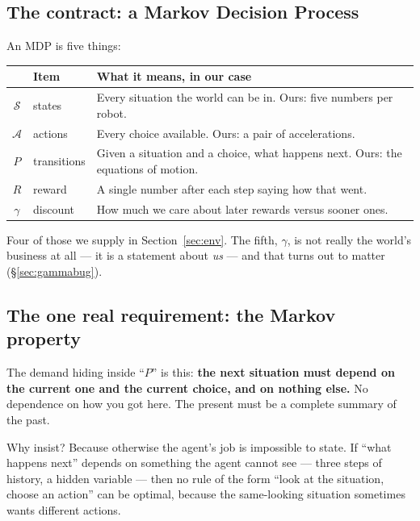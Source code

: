 \documentclass[11pt,a4paper]{article}
\begin{document}
\subsection{The contract: a Markov Decision Process}

An MDP is five things:

\begin{center}
\small
\begin{tabular}{clp{9.4cm}}
\toprule
& \textbf{Item} & \textbf{What it means, in our case} \\
\midrule
$\mathcal S$ & states     & Every situation the world can be in. Ours: five numbers per robot. \\
$\mathcal A$ & actions    & Every choice available. Ours: a pair of accelerations. \\
$P$          & transitions& Given a situation and a choice, what happens next. Ours: the equations of motion. \\
$R$          & reward     & A single number after each step saying how that went. \\
$\gamma$     & discount   & How much we care about later rewards versus sooner ones. \\
\bottomrule
\end{tabular}
\end{center}

Four of those we supply in Section~\ref{sec:env}. The fifth, $\gamma$, is not really the
world's business at all --- it is a statement about \emph{us} --- and that turns out to
matter (\S\ref{sec:gammabug}).

\subsection{The one real requirement: the Markov property}

The demand hiding inside ``$P$'' is this: \textbf{the next situation must depend on the
current one and the current choice, and on nothing else.} No dependence on how you got here.
The present must be a complete summary of the past.

Why insist? Because otherwise the agent's job is impossible to state. If ``what happens
next'' depends on something the agent cannot see --- three steps of history, a hidden
variable --- then no rule of the form ``look at the situation, choose an action'' can be
optimal, because the same-looking situation sometimes wants different actions.
\end{document}
